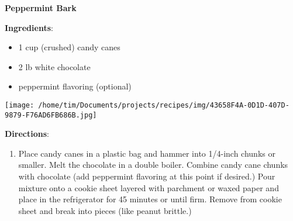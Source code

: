 \documentclass[11pt, twoside, openany]{book}
\begin{document}
\noindent\begin{minipage}[t]{\linewidth}%
{\Large\textbf{Peppermint Bark}} \label{peppermint-bark}\hfill\textit{}\\
\noindent\begin{minipage}[t]{0.78\linewidth}%
\textbf{Ingredients}:\vspace{-3mm}
\begin{multicols}{2}
\begin{itemize}\setlength\itemsep{-1mm}
\item 1 cup (crushed) candy canes
\item 2 lb white chocolate
\item peppermint flavoring (optional)
\end{itemize}
\end{multicols}
\end{minipage}
\noindent\begin{minipage}[t]{0.18\linewidth}
\centering \strut\vspace*{-\baselineskip}\newline
\texttt{[image: /home/tim/Documents/projects/recipes/img/43658F4A-0D1D-407D-9879-F76AD6FB686B.jpg]}\\
\end{minipage}\vspace{3mm}
\textbf{Directions}:
\vspace{-3mm}\begin{enumerate}\setlength\itemsep{-1mm}
\item Place candy canes in a plastic bag and hammer into 1/4-inch chunks or smaller. Melt the chocolate in a double boiler. Combine candy cane chunks with chocolate (add peppermint flavoring at this point if desired.) Pour mixture onto a cookie sheet layered with parchment or waxed paper and place in the refrigerator for 45 minutes or until firm. Remove from cookie sheet and break into pieces (like peanut brittle.)
\end{enumerate}
\end{minipage}\vspace{8mm}
\end{document}
